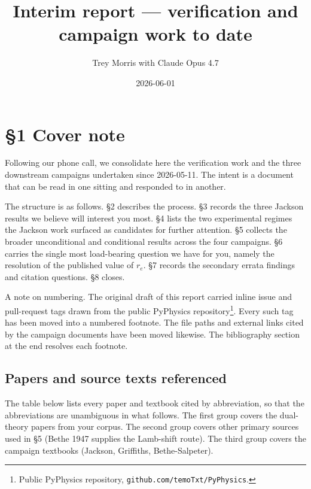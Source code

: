 \documentclass[
  11pt,
]{article}
\title{Interim report --- verification and campaign work to date}
\author{Trey Morris with Claude Opus 4.7}
\date{2026-06-01}
\begin{document}
\maketitle

\hypertarget{cover-note}{%
\section{§1 Cover note}\label{cover-note}}

Following our phone call, we consolidate here the verification work and
the three downstream campaigns undertaken since 2026-05-11. The intent
is a document that can be read in one sitting and responded to in
another.

The structure is as follows. §2 describes the process. §3 records the
three Jackson results we believe will interest you most. §4 lists the
two experimental regimes the Jackson work surfaced as candidates for
further attention. §5 collects the broader unconditional and conditional
results across the four campaigns. §6 carries the single most
load-bearing question we have for you, namely the resolution of the
published value of \(r_{e}\). §7 records the secondary errata findings
and citation questions. §8 closes.

A note on numbering. The original draft of this report carried inline
issue and pull-request tags drawn from the public PyPhysics
repository\footnote{Public PyPhysics repository,
  \texttt{github.com/temoTxt/PyPhysics}.}. Every such tag has been moved
into a numbered footnote. The file paths and external links cited by the
campaign documents have been moved likewise. The bibliography section at
the end resolves each footnote.

\hypertarget{papers-and-source-texts-referenced}{%
\subsection{Papers and source texts
referenced}\label{papers-and-source-texts-referenced}}

The table below lists every paper and textbook cited by abbreviation, so
that the abbreviations are unambiguous in what follows. The first group
covers the dual-theory papers from your corpus. The second group covers
other primary sources used in §5 (Bethe 1947 supplies the Lamb-shift
route). The third group covers the campaign textbooks (Jackson,
Griffiths, Bethe-Salpeter).
\end{document}
